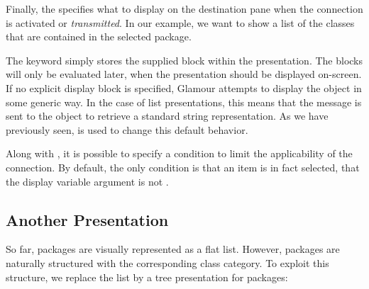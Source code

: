 \documentclass[a4paper,10pt,twoside]{book}
\begin{document}
Finally, the  specifies what to display on the destination
pane when the connection is activated or \emph{transmitted}. In our
example, we want to show a list of the classes that are contained in
the selected package.

The  keyword simply stores the supplied block within the
presentation. The blocks will only be evaluated later, when the
presentation should be displayed on-screen. If no explicit display
block is specified, Glamour attempts to display the object in some
generic way. In the case of list presentations, this means that the
 message is sent to the object to retrieve a
standard string representation. As we have previously seen,  is used to change
this default behavior.

Along with , it is possible to specify a 
condition to limit the applicability of the connection. By default,
the only condition is that an item is in fact selected, \ie{} that the
display variable argument is not .

\subsection{Another Presentation}
So far, packages are visually represented as a flat list. However, packages are naturally structured with the corresponding class category. To
exploit this structure, we replace the list by a tree presentation for packages:


\end{document}
